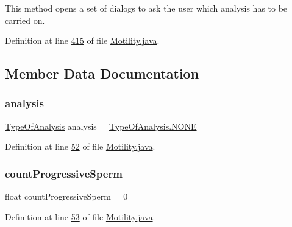 This method opens a set of dialogs to ask the user which analysis has to be carried on. 

Definition at line \hyperlink{_motility_8java_source_l00415}{415} of file \hyperlink{_motility_8java_source}{Motility.\+java}.



\subsection{Member Data Documentation}
\hypertarget{classanalysis_1_1_motility_ae0c6f15cfb3c589fb7817738e51998bd}{}\label{classanalysis_1_1_motility_ae0c6f15cfb3c589fb7817738e51998bd} 
\subsubsection{\texorpdfstring{analysis}{analysis}}
{\footnotesize\ttfamily \hyperlink{enumanalysis_1_1_motility_1_1_type_of_analysis}{Type\+Of\+Analysis} analysis = \hyperlink{enumanalysis_1_1_motility_1_1_type_of_analysis_a899caa602e4fff675b17cdbab33607ec}{Type\+Of\+Analysis.\+N\+O\+NE}\hspace{0.3cm}{\ttfamily [private]}}



Definition at line \hyperlink{_motility_8java_source_l00052}{52} of file \hyperlink{_motility_8java_source}{Motility.\+java}.

\hypertarget{classanalysis_1_1_motility_a4781116c1a5f8316e2cacb2e92dac270}{}\label{classanalysis_1_1_motility_a4781116c1a5f8316e2cacb2e92dac270} 
\subsubsection{\texorpdfstring{count\+Progressive\+Sperm}{countProgressiveSperm}}
{\footnotesize\ttfamily float count\+Progressive\+Sperm = 0\hspace{0.3cm}{\ttfamily [private]}}



Definition at line \hyperlink{_motility_8java_source_l00053}{53} of file \hyperlink{_motility_8java_source}{Motility.\+java}.

